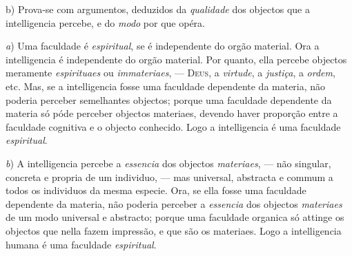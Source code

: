 b) Prova-se com argumentos, deduzidos da \emph{qualidade} dos objectos que a intelligencia percebe, e do \emph{modo} por que opéra.

\emph{a}) Uma faculdade é \emph{espiritual}, se é independente do orgão material. Ora a intelligencia é independente do orgão material. Por quanto, ella percebe objectos meramente \emph{espirituaes} ou \emph{immateriaes}, --- \textsc{Deus}, a \emph{virtude}, a \emph{justiça}, a \emph{ordem}, etc. Mas, se a intelligencia fosse uma faculdade dependente da materia, não poderia perceber semelhantes objectos; porque uma faculdade dependente da materia só póde perceber objectos materiaes, devendo haver proporção entre a faculdade cognitiva e o objecto conhecido. Logo a intelligencia é uma faculdade \emph{espiritual}.

\emph{b}) A intelligencia percebe a \emph{essencia} dos objectos \emph{materiaes}, --- não singular, concreta e propria de um individuo, --- mas universal, abstracta e commum a todos os individuos da mesma especie. Ora, se ella fosse uma faculdade dependente da materia, não poderia perceber a \emph{essencia} dos objectos \emph{materiaes}   de um modo universal e abstracto; porque uma faculdade organica só attinge os objectos que nella fazem impressão, e que são os materiaes. Logo a intelligencia humana é uma faculdade \emph{espiritual}.

